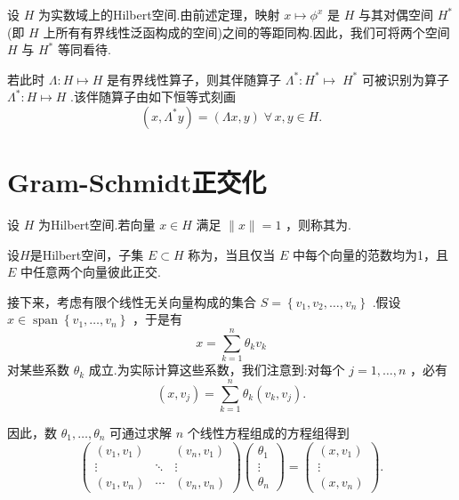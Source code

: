 \begin{remark}\label{rem:hilbert-dual-identification}
设 $H$ 为实数域上的Hilbert空间.由前述定理，映射 $x \mapsto  {\phi }^{x}$ 是 $H$ 与其对偶空间 ${H}^{ * }$ (即 $H$ 上所有有界线性泛函构成的空间)之间的等距同构.因此，我们可将两个空间 $H$ 与 ${H}^{ * }$ 等同看待.

若此时 $\Lambda  : H \mapsto  H$ 是有界线性算子，则其伴随算子 ${\Lambda }^{ * } : {H}^{ * } \mapsto \; {H}^{ * }$ 可被识别为算子 ${\Lambda }^{ * } : H \mapsto  H$ .该伴随算子由如下恒等式刻画
\[
\left( {x,{\Lambda }^{ * }y}\right)  = \left( {{\Lambda x},y}\right) \;\forall\,x,y \in  H.
\]
\end{remark}

\section{Gram-Schmidt正交化}

设 $H$ 为Hilbert空间.若向量 $x \in  H$ 满足 $\| x\|  = 1$ ，则称其为.
\begin{definition}[标准正交]
    设$H$是Hilbert空间，子集 $E \subset  H$ 称为，当且仅当 $E$ 中每个向量的范数均为1，且 $E$ 中任意两个向量彼此正交.
\end{definition}


接下来，考虑有限个线性无关向量构成的集合 $S = \left\{  {{v}_{1},{v}_{2},\ldots ,{v}_{n}}\right\}$ .假设 $x \in  \operatorname{span}\left\{  {{v}_{1},\ldots ,{v}_{n}}\right\}$ ，于是有
\[
x = \sum\limits_{{k = 1}}^{n}{\theta }_{k}{v}_{k}
\]
对某些系数 ${\theta }_{k}$ 成立.为实际计算这些系数，我们注意到:对每个 $j = 1,\ldots ,n$ ，必有
\[
\left( {x,{v}_{j}}\right)  = \sum\limits_{{k = 1}}^{n}{\theta }_{k}\left( {{v}_{k},{v}_{j}}\right) .
\]

因此，数 ${\theta }_{1},\ldots ,{\theta }_{n}$ 可通过求解 $n$ 个线性方程组成的方程组得到
\begin{equation}\tag{5.7}\label{eq:gram-schmidt-linear-system}
\left( \begin{matrix} \left( {{v}_{1},{v}_{1}}\right) & & \left( {{v}_{n},{v}_{1}}\right) \\  \vdots &  \ddots  & \vdots \\  \left( {{v}_{1},{v}_{n}}\right) & \cdots & \left( {{v}_{n},{v}_{n}}\right)  \end{matrix}\right) \left( \begin{matrix} {\theta }_{1} \\  \vdots \\  {\theta }_{n} \end{matrix}\right)  = \left( \begin{matrix} \left( {x,{v}_{1}}\right) \\  \vdots \\  \left( {x,{v}_{n}}\right)  \end{matrix}\right) .
\end{equation}

